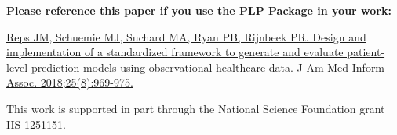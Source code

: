 \documentclass[]{article}
\begin{document}
\textbf{Please reference this paper if you use the PLP Package in your
work:}

\href{http://dx.doi.org/10.1093/jamia/ocy032}{Reps JM, Schuemie MJ,
Suchard MA, Ryan PB, Rijnbeek PR. Design and implementation of a
standardized framework to generate and evaluate patient-level prediction
models using observational healthcare data. J Am Med Inform Assoc.
2018;25(8):969-975.}

This work is supported in part through the National Science Foundation
grant IIS 1251151.
\end{document}
